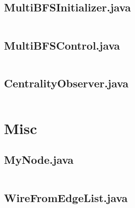\documentclass[a4paper, 10pt]{article}
\begin{document}
\subsection*{MultiBFSInitializer.java}
\inputminted[firstline=21]{java}{../src/centrality/MultiBFSInitializer.java}
\subsection*{MultiBFSControl.java}
\inputminted[firstline=21]{java}{../src/centrality/MultiBFSControl.java}
\subsection*{CentralityObserver.java}
\inputminted[firstline=16]{java}{../src/centrality/CentralityObserver.java}

\section{Misc}

\subsection*{MyNode.java}
\inputminted[firstline=15]{java}{../src/centrality/MyNode.java}
\subsection*{WireFromEdgeList.java}
\inputminted[firstline=19]{java}{../src/centrality/WireFromEdgeList.java}
\end{document}
